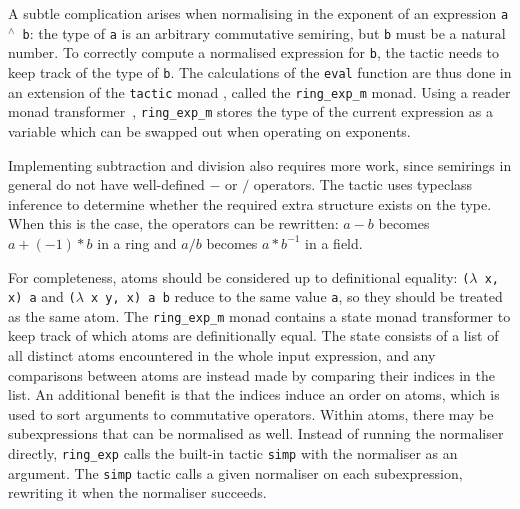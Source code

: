\documentclass{llncs}
\newcommand{\lean}[1]{\texttt{#1}\xspace} %
\newcommand{\pow}{{${}^\wedge$}\xspace}
\newcommand{\ringexp}{\lean{ring\_exp}}
\begin{document}
A subtle complication arises when normalising in the exponent of an expression \lean{a \pow b}:
the type of \lean{a} is an arbitrary commutative semiring, but \lean{b} must be a natural number.
To correctly compute a normalised expression for \lean{b},
the tactic needs to keep track of the type of \lean{b}.
The calculations of the \lean{eval} function are thus done in an extension of the \lean{tactic} monad%
, called the \lean{ring\_exp\_m} monad.
Using a reader monad transformer~\cite{monad-transformers},
\lean{ring\_exp\_m} stores the type of the current expression
as a variable which can be swapped out when operating on exponents.

Implementing subtraction and division also requires more work,
since semirings in general do not have well-defined $-$ or $/$ operators.
The tactic uses typeclass inference to determine whether the required extra structure exists on the type.
When this is the case, the operators can be rewritten:
$a - b$ becomes $a + (-1) * b$ in a ring
and $a / b$ becomes $a * b^{-1}$ in a field.

For completeness, atoms should be considered up to definitional equality:
\lean{($\lambda$ x, x) a} and \lean{($\lambda$ x y, x) a b} reduce to the same value \lean{a},
so %
they should be treated as the same atom.
The \lean{ring\_exp\_m} monad contains a state monad transformer to keep track of which atoms are definitionally equal.
The state consists of a list of all distinct atoms encountered in the whole input expression,
and any comparisons between atoms are instead made by comparing their indices in the list.
An additional benefit is that the indices induce an order on atoms, which is used to sort arguments to commutative operators.
Within atoms, there may be subexpressions that can be normalised as well.
Instead of running the normaliser directly, \ringexp calls the built-in tactic \lean{simp} with the normaliser as an argument.
The \lean{simp} tactic calls a given normaliser on each subexpression,
rewriting it when the normaliser succeeds.
\end{document}
